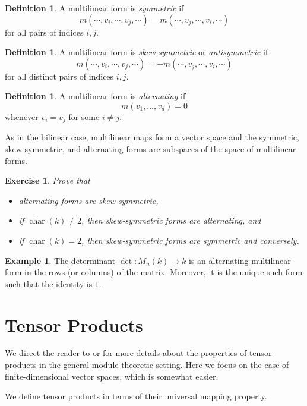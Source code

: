 \documentclass[12pt]{article}
\theoremstyle{plain}
\newtheorem{exercise}[theorem]{Exercise}
\theoremstyle{definition}
\newtheorem{definition}[theorem]{Definition}
\newtheorem{example}[theorem]{Example}
\theoremstyle{remark}
\numberwithin{equation}{section}
\begin{document}
\begin{definition}
A multilinear form is
\emph{symmetric} if
\[
m(\cdots,v_i,\cdots,v_j,\cdots) = m(\cdots,v_j,\cdots,v_i,\cdots)
\]
for all pairs of indices $i,j$.
\end{definition}

\begin{definition}
A multilinear form is \emph{skew-symmetric} or \emph{antisymmetric} if
\[
m(\cdots,v_i,\cdots,v_j,\cdots) = -m(\cdots,v_j,\cdots,v_i,\cdots)
\]
for all distinct pairs of indices $i,j$.
\end{definition}

\begin{definition}
A multilinear form is \emph{alternating} if
\[
m(v_1,\ldots,v_d) = 0
\]
whenever $v_i=v_j$ for some $i \ne j$.
\end{definition}

As in the bilinear case, multilinear maps form a vector space and the
symmetric, skew-symmetric, and alternating forms are subspaces of the
space of multilinear forms.

\begin{exercise}
Prove that
\begin{itemize}
\item alternating forms are skew-symmetric,
\item if $\operatorname{char}(k) \ne 2$, then skew-symmetric forms are
alternating, and
\item if $\operatorname{char}(k) = 2$, then skew-symmetric forms are
symmetric and conversely.
\end{itemize}
\end{exercise}

\begin{example}
The determinant $\det : M_n(k) \to k$ is an alternating multilinear form
in the rows (or columns) of the matrix.
Moreover, it is the unique such form such that the identity is $1$.
\end{example}

\section{Tensor Products}

We direct the reader to \cite[10.4]{DF} or \cite[XVI]{Lang}
for more details about the properties of tensor products in the general
module-theoretic setting.
Here we focus on the case of finite-dimensional vector spaces,
which is somewhat easier.

We define tensor products in terms of their universal mapping property.
\end{document}
